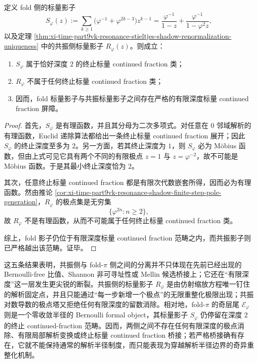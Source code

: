\begin{proposition}\label{prop:xi-time-part9vk-scalar-continued-fraction-depth-splitting}
定义 fold 侧的标量影子
\[
S_\varphi(z):=
\sum_{k\ge 1}\bigl(\varphi^{-1}+\varphi^{2k-3}\bigr)z^{k-1}
=
\frac{\varphi^{-1}}{1-z}+\frac{\varphi^{-1}}{1-\varphi^2 z},
\]
以及定理 \ref{thm:xi-time-part9vk-resonance-stieltjes-shadow-renormalization-uniqueness} 中的共振侧标量影子 \(R_\varphi(z)\)。则成立：
\begin{enumerate}
  \item \(S_\varphi\) 属于恰好深度 \(2\) 的终止标量 continued fraction 类；
  \item \(R_\varphi\) 不属于任何终止标量 continued fraction 类；
  \item 因而，fold 标量影子与共振标量影子之间存在严格的有限深度标量 continued fraction 屏障。
\end{enumerate}
\end{proposition}
\begin{proof}
首先，\(S_\varphi\) 是有理函数，并且其分母为二次多项式。对任意在 \(0\) 邻域解析的有理函数，Euclid 递除算法都给出一条终止标量 continued fraction 展开；因此 \(S_\varphi\) 的终止深度至多为 \(2\)。另一方面，若其终止深度为 \(1\)，则 \(S_\varphi\) 必为 Möbius 函数，但由上式可见它具有两个不同的有限极点 \(z=1\) 与 \(z=\varphi^{-2}\)，故不可能是 Möbius 函数。于是其最小终止深度恰为 \(2\)。

其次，任意终止标量 continued fraction 都是有限次代数嵌套所得，因而必为有理函数。然由推论 \ref{cor:xi-time-part9vk-resonance-shadow-finite-step-pole-generation}，\(R_\varphi\) 的极点集是无穷集
\[
\{\varphi^{2n}:n\ge 2\},
\]
故 \(R_\varphi\) 不是有理函数，从而不可能属于任何终止标量 continued fraction 类。

综上，fold 影子仍位于有限深度标量 continued fraction 范畴之内，而共振影子则已严格越出该范畴。证毕。
\end{proof}

\noindent
这五条结果表明，共振侧与 fold-\(\pi\) 侧之间的分离并不只体现在先前已经出现的 Bernoulli-free 比值、Shannon 非可寻址性或 Mellin 候选桥接上；它还在“有限深度”这一层发生更尖锐的断裂。共振侧的标量影子 \(R_\varphi\) 是由仿射缩放方程唯一钉住的解析固定点，并且只能通过“每一步新增一个极点”的无限重整化极限出现；共振对数导数的极点塔又拒绝任何有限深度的留数消除。相对地，fold-\(\pi\) 的奇层尾 \(\mathcal E_\varphi\) 则是一个零收敛半径的 Bernoulli formal object，其标量影子 \(S_\varphi\) 仍停留在深度 \(2\) 的终止 continued-fraction 范畴。因而，两侧之间不存在任何有限深度的极点消除、有限局部解析变换或终止标量 continued fraction 桥接；若严格桥接确有存在，它就不能保持通常的解析半径制度，而只能表现为穿越解析半径边界的奇异重整化机制。

\endinput
